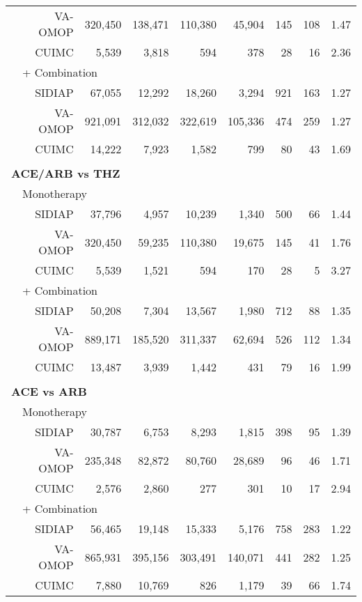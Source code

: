 \documentclass[11pt,]{article}
\begin{document}
\begin{longtable}{p{-2em}p{-2em}rrrrrrrr}
   &  & VA-OMOP & 320,450 & 138,471 & 110,380 & 45,904 & 145 & 108 & 1.47 \\ 
   &  & CUIMC & 5,539 & 3,818 & 594 & 378 & 28 & 16 & 2.36 \\ 
                           & \multicolumn{8}{l}{+ Combination} \\ &  & SIDIAP & 67,055 & 12,292 & 18,260 & 3,294 & 921 & 163 & 1.27 \\ 
   &  & VA-OMOP & 921,091 & 312,032 & 322,619 & 105,336 & 474 & 259 & 1.27 \\ 
   &  & CUIMC & 14,222 & 7,923 & 1,582 & 799 & 80 & 43 & 1.69 \\ 
   \rowcolor{white} \\ \multicolumn{9}{l}{\textbf{ACE/ARB vs THZ}} \\ & \multicolumn{9}{l}{Monotherapy}  \\ &  & SIDIAP & 37,796 & 4,957 & 10,239 & 1,340 & 500 & 66 & 1.44 \\ 
   &  & VA-OMOP & 320,450 & 59,235 & 110,380 & 19,675 & 145 & 41 & 1.76 \\ 
   &  & CUIMC & 5,539 & 1,521 & 594 & 170 & 28 & 5 & 3.27 \\ 
                           & \multicolumn{8}{l}{+ Combination} \\ &  & SIDIAP & 50,208 & 7,304 & 13,567 & 1,980 & 712 & 88 & 1.35 \\ 
   &  & VA-OMOP & 889,171 & 185,520 & 311,337 & 62,694 & 526 & 112 & 1.34 \\ 
   &  & CUIMC & 13,487 & 3,939 & 1,442 & 431 & 79 & 16 & 1.99 \\ 
   \rowcolor{white} \\ \multicolumn{9}{l}{\textbf{ACE vs ARB}} \\ & \multicolumn{9}{l}{Monotherapy}  \\ &  & SIDIAP & 30,787 & 6,753 & 8,293 & 1,815 & 398 & 95 & 1.39 \\ 
   &  & VA-OMOP & 235,348 & 82,872 & 80,760 & 28,689 & 96 & 46 & 1.71 \\ 
   &  & CUIMC & 2,576 & 2,860 & 277 & 301 & 10 & 17 & 2.94 \\ 
                           & \multicolumn{8}{l}{+ Combination} \\ &  & SIDIAP & 56,465 & 19,148 & 15,333 & 5,176 & 758 & 283 & 1.22 \\ 
   &  & VA-OMOP & 865,931 & 395,156 & 303,491 & 140,071 & 441 & 282 & 1.25 \\ 
   &  & CUIMC & 7,880 & 10,769 & 826 & 1,179 & 39 & 66 & 1.74 \\ 

\end{longtable}
\end{document}
